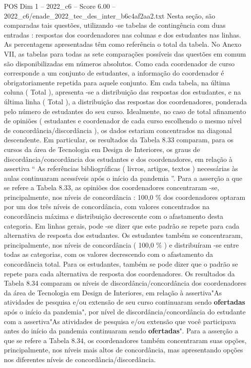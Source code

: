 \begin{textsample}{POS Dim 1 – 2022\_c6 – Score 6.00 – 2022\_c6/enade\_2022\_tec\_des\_inter\_b6c4af2aa2.txt}
Nesta seção, são comparadas tais questões, utilizando -se tabelas de contingência com duas entradas : respostas dos coordenadores nas colunas e dos estudantes nas linhas.
As percentagens apresentadas têm como referência o total da tabela.
No Anexo VII, as tabelas para todas as sete comparações possíveis das questões em comum são disponibilizadas em números absolutos.
Como cada coordenador de curso corresponde a um conjunto de estudantes, a informação do coordenador é obrigatoriamente repetida para aquele conjunto.
Em cada tabela, na última coluna ( Total ), apresenta -se a distribuição das respostas dos estudantes, e na última linha ( Total ), a distribuição das respostas dos coordenadores, ponderada pelo número de estudantes do seu curso.
Idealmente, no caso de total afinamento de opiniões ( estudantes e coordenador de cada curso escolhendo o mesmo nível de concordância/discordância ), os dados estariam concentrados na diagonal descendente.
Em particular, os resultados da Tabela 8.33 comparam, para os cursos da área de Tecnologia em Design de Interiores, os graus de discordância/concordância dos estudantes e dos coordenadores, em relação à assertiva “ As referências bibliográficas ( livros, artigos, textos ) necessárias às aulas continuaram acessíveis após o início da pandemia ”.
Para a asserção a que se refere a Tabela 8.33, as opiniões dos coordenadores concentraram -se, principalmente, nos níveis de concordância : 100,0 \% dos coordenadores optaram por um dos três níveis de concordância, com valores concentrados na concordância máxima e distribuição decrescente com o afastamento desta categoria.
Em linhas gerais, pode -se dizer que este padrão se repete para cada alternativa de resposta dos estudantes.
Os estudantes também se concentraram, principalmente, nos níveis de concordância ( 100,0 \% ) e distribuíram -se entre todas as categorias, com os valores decrescendo com o afastamento da concordância total.
Para os estudantes, também se pode dizer que o padrão se repete para cada alternativa de resposta dos coordenadores.
Os resultados da Tabela 8.34 comparam os níveis de discordância/concordância dos coordenadores da área de Tecnologia em Design de Interiores, em relação à assertiva"As atividades de pesquisa e/ou extensão de seu curso continuaram sendo \textbf{ofertadas} após o início da pandemia", por nível de discordância/concordância do estudante com a assertiva"As atividades de pesquisa e/ou extensão que você participava antes do início da pandemia continuaram sendo \textbf{ofertadas}".
Para a asserção a que se refere a Tabela 8.34, os coordenadores também concentraram suas opções, principalmente, nos níveis mais altos de concordância, mas apresentando opções nos diferentes níveis de concordância/discordância.

\end{textsample}
